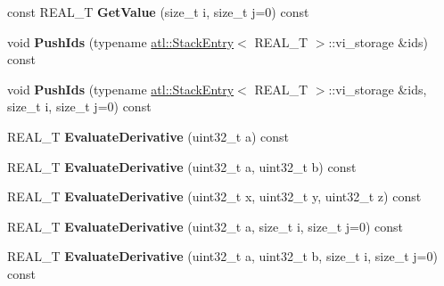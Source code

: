 \begin{DoxyCompactItemize}
\item 
\hypertarget{structatl_1_1_add_a13e0ac75627c1747496f5aac500eb128}{const R\+E\+A\+L\+\_\+\+T {\bfseries Get\+Value} (size\+\_\+t i, size\+\_\+t j=0) const }\label{structatl_1_1_add_a13e0ac75627c1747496f5aac500eb128}

\item 
\hypertarget{structatl_1_1_add_a52a005a7a1dc1f38d77d6f142f3bea64}{void {\bfseries Push\+Ids} (typename \hyperlink{structatl_1_1_stack_entry}{atl\+::\+Stack\+Entry}$<$ R\+E\+A\+L\+\_\+\+T $>$\+::vi\+\_\+storage \&ids) const }\label{structatl_1_1_add_a52a005a7a1dc1f38d77d6f142f3bea64}

\item 
\hypertarget{structatl_1_1_add_a27cba5452b589a46fd4d6ab2abc1a7ea}{void {\bfseries Push\+Ids} (typename \hyperlink{structatl_1_1_stack_entry}{atl\+::\+Stack\+Entry}$<$ R\+E\+A\+L\+\_\+\+T $>$\+::vi\+\_\+storage \&ids, size\+\_\+t i, size\+\_\+t j=0) const }\label{structatl_1_1_add_a27cba5452b589a46fd4d6ab2abc1a7ea}

\item 
\hypertarget{structatl_1_1_add_a73a19f4ac2a363fcff0640f4132965d2}{R\+E\+A\+L\+\_\+\+T {\bfseries Evaluate\+Derivative} (uint32\+\_\+t a) const }\label{structatl_1_1_add_a73a19f4ac2a363fcff0640f4132965d2}

\item 
\hypertarget{structatl_1_1_add_a5bd2834df379dfb3afc945923b2fedd9}{R\+E\+A\+L\+\_\+\+T {\bfseries Evaluate\+Derivative} (uint32\+\_\+t a, uint32\+\_\+t b) const }\label{structatl_1_1_add_a5bd2834df379dfb3afc945923b2fedd9}

\item 
\hypertarget{structatl_1_1_add_ad6c38c9c3ef3bdb2eef2bc4b5832002f}{R\+E\+A\+L\+\_\+\+T {\bfseries Evaluate\+Derivative} (uint32\+\_\+t x, uint32\+\_\+t y, uint32\+\_\+t z) const }\label{structatl_1_1_add_ad6c38c9c3ef3bdb2eef2bc4b5832002f}

\item 
\hypertarget{structatl_1_1_add_a6762170a058b3e16760e6184f9a15759}{R\+E\+A\+L\+\_\+\+T {\bfseries Evaluate\+Derivative} (uint32\+\_\+t a, size\+\_\+t i, size\+\_\+t j=0) const }\label{structatl_1_1_add_a6762170a058b3e16760e6184f9a15759}

\item 
\hypertarget{structatl_1_1_add_a285b53b270ef1c8bda91fee83ae7ae19}{R\+E\+A\+L\+\_\+\+T {\bfseries Evaluate\+Derivative} (uint32\+\_\+t a, uint32\+\_\+t b, size\+\_\+t i, size\+\_\+t j=0) const }\label{structatl_1_1_add_a285b53b270ef1c8bda91fee83ae7ae19}


\end{DoxyCompactItemize}
